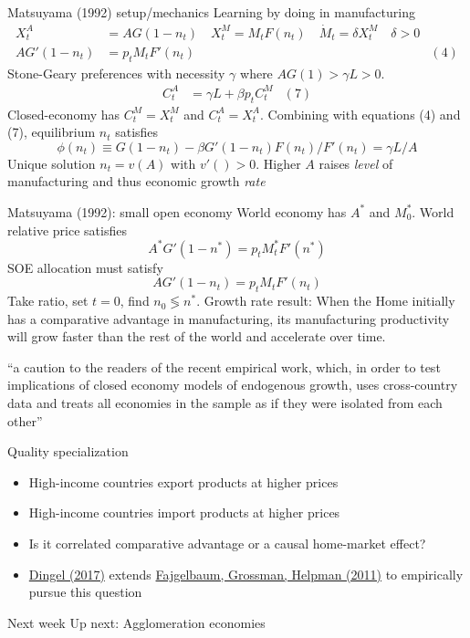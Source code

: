 \documentclass[11pt,notes=hide,aspectratio=169]{beamer}
\begin{document}
\begin{frame}{Matsuyama (1992) setup/mechanics}
Learning by doing in manufacturing
\begin{align*}
X_t^A 
&=
A G(1-n_t)
\quad
X_t^M 
=
M_t F(n_t)
\quad
\dot{M}_t 
=
\delta X_t^M \quad \delta>0
\\
A G'(1-n_t)
&=
p_t M_t F'(n_t)
&(4)
\end{align*}
Stone-Geary preferences with necessity $\gamma$ where $AG(1)>\gamma L > 0$.
\begin{align*}
C_t^A &= \gamma L + \beta p_t C_t^M 
& (7)
\end{align*}
Closed-economy has $C_t^M=X_t^M$ and $C_t^A=X_t^A$. Combining with equations (4) and (7), equilibrium $n_t$ satisfies
$$
\phi(n_t)
\equiv
G(1-n_t)-\beta G'(1-n_t)F(n_t)/F'(n_t)
=
\gamma L / A
$$
Unique solution $n_t = v(A)$ with $v'()>0$.
Higher $A$ raises \textit{level} of manufacturing and thus economic growth \textit{rate}
\end{frame}
\begin{frame}{Matsuyama (1992): small open economy}
World economy has $A^{*}$ and $M_{0}^{*}$.
World relative price satisfies
$$
A^{*} G'(1-n^{*})
=
p_t M_t^{*} F'(n^{*})
$$
SOE allocation must satisfy
$$
A G'(1-n_t)
=
p_t M_t F'(n_t)
$$
Take ratio, set $t=0$, find $n_0 \lessgtr n^{*}$.
\smallskip
Growth rate result: When the Home initially has a comparative advantage in manufacturing,
its manufacturing productivity will grow faster than the rest of the world
and accelerate over time.
\smallskip
{\small ``a caution to the readers of the recent empirical work, which, in order to test implications of closed economy models of endogenous growth,
uses cross-country data and treats all economies in the sample as if they were isolated from each other''\par}
\end{frame}
\begin{frame}{Quality specialization}
\begin{itemize}
	\item High-income countries export products at higher prices
	\item High-income countries import products at higher prices
	\item Is it correlated comparative advantage or a causal home-market effect?
	\item \href{https://academic.oup.com/restud/article/84/4/1551/2684498}{Dingel (2017)} extends \href{http://www.journals.uchicago.edu/doi/abs/10.1086/662628}{Fajgelbaum, Grossman, Helpman (2011)} to empirically pursue this question
\end{itemize}
\end{frame}
\begin{frame}{Next week}
Up next: Agglomeration economies
\end{frame}
\end{document}
